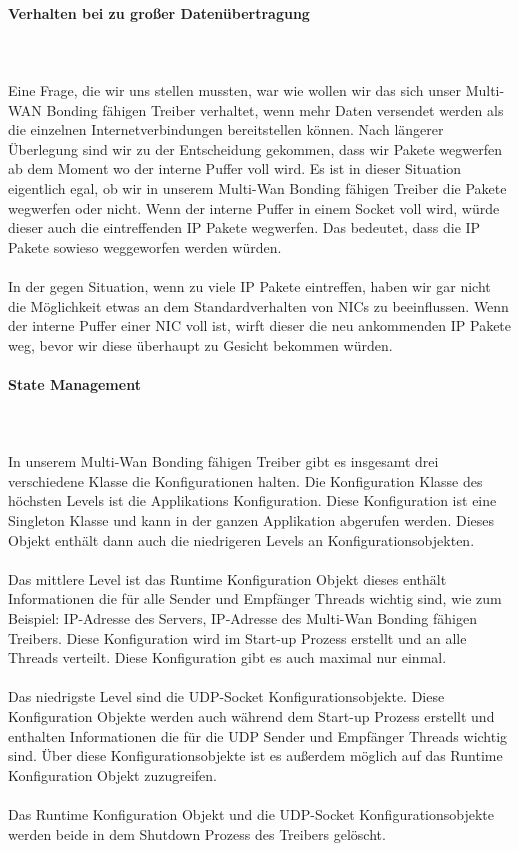 \paragraph{Verhalten bei zu großer Datenübertragung}
\ \\\\
Eine Frage, die wir uns stellen mussten, war wie wollen wir das sich unser Multi-WAN Bonding fähigen Treiber verhaltet, wenn mehr Daten versendet werden als die einzelnen Internetverbindungen bereitstellen können. Nach längerer Überlegung sind wir zu der Entscheidung gekommen, dass wir Pakete wegwerfen ab dem Moment wo der interne Puffer voll wird. Es ist in dieser Situation eigentlich egal, ob wir in unserem Multi-Wan Bonding fähigen Treiber die Pakete wegwerfen oder nicht. Wenn der interne Puffer in einem Socket voll wird, würde dieser auch die eintreffenden IP Pakete wegwerfen. Das bedeutet, dass die IP Pakete sowieso weggeworfen werden würden.
\\\\
In der gegen Situation, wenn zu viele IP Pakete eintreffen, haben wir gar nicht die Möglichkeit etwas an dem Standardverhalten von NICs zu beeinflussen. Wenn der interne Puffer einer NIC voll ist, wirft dieser die neu ankommenden IP Pakete weg, bevor wir diese überhaupt zu Gesicht bekommen würden.
\paragraph{State Management}
\ \\\\
In unserem Multi-Wan Bonding fähigen Treiber gibt es insgesamt drei verschiedene Klasse die Konfigurationen halten. Die Konfiguration Klasse des höchsten Levels ist die Applikations Konfiguration. Diese Konfiguration ist eine Singleton Klasse und kann in der ganzen Applikation abgerufen werden. Dieses Objekt enthält dann auch die niedrigeren Levels an Konfigurationsobjekten.
\\\\
Das mittlere Level ist das Runtime Konfiguration Objekt dieses enthält Informationen die für alle Sender und Empfänger Threads wichtig sind, wie zum Beispiel: IP-Adresse des Servers, IP-Adresse des Multi-Wan Bonding fähigen Treibers. Diese Konfiguration wird im Start-up Prozess erstellt und an alle Threads verteilt. Diese Konfiguration gibt es auch maximal nur einmal.
\\\\
Das niedrigste Level sind die UDP-Socket Konfigurationsobjekte. Diese Konfiguration Objekte werden auch während dem Start-up Prozess erstellt und enthalten Informationen die für die UDP Sender und Empfänger Threads wichtig sind. Über diese Konfigurationsobjekte ist es außerdem möglich auf das Runtime Konfiguration Objekt zuzugreifen. 
\\\\
Das Runtime Konfiguration Objekt und die UDP-Socket Konfigurationsobjekte werden beide in dem Shutdown Prozess des Treibers gelöscht.
